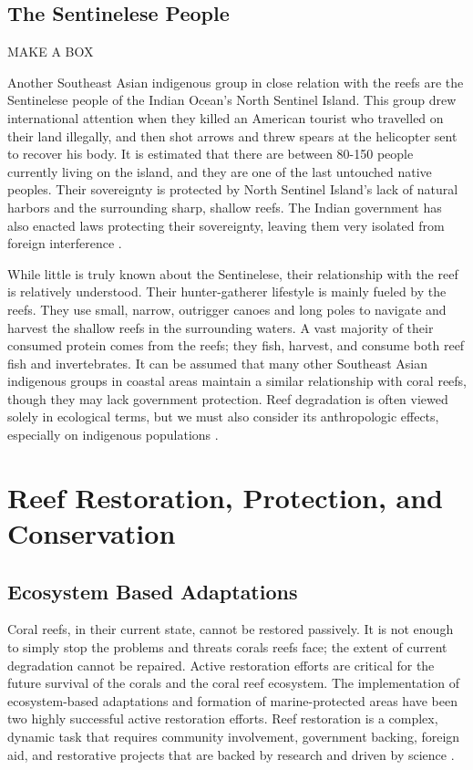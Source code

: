 \documentclass{book}\usepackage{knitr}
\begin{document}
\subsection{The Sentinelese People}

MAKE A BOX

Another Southeast Asian indigenous group in close relation with the reefs are the Sentinelese people of the Indian Ocean’s North Sentinel Island. This group drew international attention when they killed an American tourist who travelled on their land illegally, and then shot arrows and threw spears at the helicopter sent to recover his body. It is estimated that there are between 80-150 people currently living on the island, and they are one of the last untouched native peoples. Their sovereignty is protected by North Sentinel Island’s lack of natural harbors and the surrounding sharp, shallow reefs. The Indian government has also enacted laws protecting their sovereignty, leaving them very isolated from foreign interference \citep{Smith}.

While little is truly known about the Sentinelese, their relationship with the reef is relatively understood. Their hunter-gatherer lifestyle is mainly fueled by the reefs. They use small, narrow, outrigger canoes and long poles to navigate and harvest the shallow reefs in the surrounding waters. A vast majority of their consumed protein comes from the reefs; they fish, harvest, and consume both reef fish and invertebrates. It can be assumed that many other Southeast Asian indigenous groups in coastal areas maintain a similar relationship with coral reefs, though they may lack government protection. Reef degradation is often viewed solely in ecological terms, but we must also consider its anthropologic effects, especially on indigenous populations \citep{Smith}.

\section{Reef Restoration, Protection, and Conservation}

\subsection{Ecosystem Based Adaptations}

Coral reefs, in their current state, cannot be restored passively. It is not enough to simply stop the problems and threats corals reefs face; the extent of current degradation cannot be repaired. Active restoration efforts are critical for the future survival of the corals and the coral reef ecosystem. The implementation of ecosystem-based adaptations and formation of marine-protected areas have been two highly successful active restoration efforts. Reef restoration is a complex, dynamic task that requires community involvement, government backing, foreign aid, and restorative projects that are backed by research and driven by science \citep{14551496520201201}. 
\end{document}
